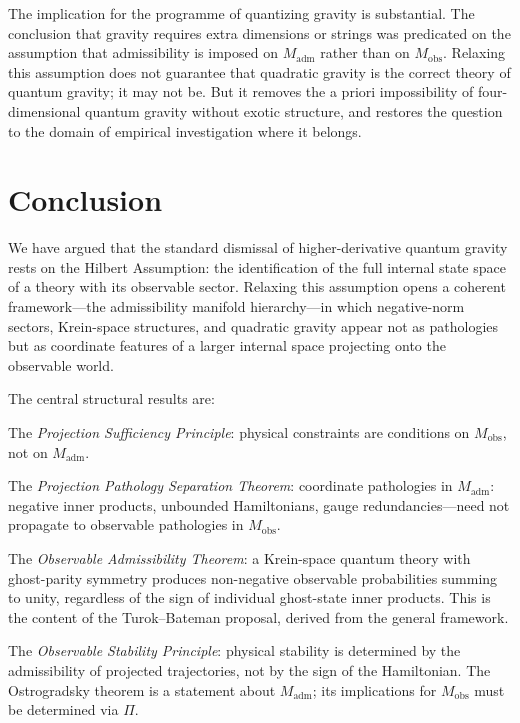 \documentclass[12pt,a4paper]{article}
\theoremstyle{remark}
\begin{document}
The implication for the programme of quantizing gravity is substantial. The
conclusion that gravity requires extra dimensions or strings was predicated
on the assumption that admissibility is imposed on $M_{\mathrm{adm}}$ rather
than on $M_{\mathrm{obs}}$. Relaxing this assumption does not guarantee that
quadratic gravity is the correct theory of quantum gravity; it may not be.
But it removes the a priori impossibility of four-dimensional quantum gravity
without exotic structure, and restores the question to the domain of
empirical investigation where it belongs.


\section{Conclusion}

We have argued that the standard dismissal of higher-derivative quantum
gravity rests on the Hilbert Assumption: the identification of the full
internal state space of a theory with its observable sector. Relaxing
this assumption opens a coherent framework---the admissibility manifold
hierarchy---in which negative-norm sectors, Krein-space structures, and
quadratic gravity appear not as pathologies but as coordinate features of
a larger internal space projecting onto the observable world.

The central structural results are:

The \emph{Projection Sufficiency Principle}: physical constraints are
conditions on $M_{\mathrm{obs}}$, not on $M_{\mathrm{adm}}$.

The \emph{Projection Pathology Separation Theorem}: coordinate pathologies
in $M_{\mathrm{adm}}$: negative inner products, unbounded
Hamiltonians, gauge redundancies---need not propagate to observable
pathologies in $M_{\mathrm{obs}}$.

The \emph{Observable Admissibility Theorem}: a Krein-space quantum theory
with ghost-parity symmetry produces non-negative observable probabilities
summing to unity, regardless of the sign of individual ghost-state inner
products. This is the content of the Turok--Bateman proposal, derived from
the general framework.

The \emph{Observable Stability Principle}: physical stability is determined
by the admissibility of projected trajectories, not by the sign of the
Hamiltonian. The Ostrogradsky theorem is a statement about $M_{\mathrm{adm}}$;
its implications for $M_{\mathrm{obs}}$ must be determined via $\Pi$.
\end{document}
